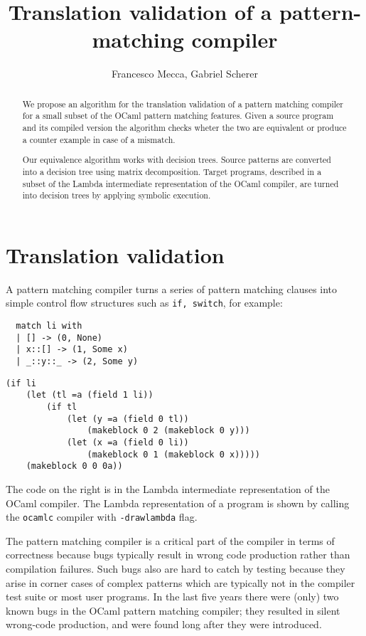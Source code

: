 \documentclass[12pt]{article}
\title{Translation validation of a pattern-matching compiler}
\author{Francesco Mecca, Gabriel Scherer}
\begin{document}
\maketitle

\begin{abstract}
We propose an algorithm for the translation validation of a pattern
matching compiler for a small subset of the OCaml pattern
matching features. Given a source program and its compiled version the
algorithm checks wheter the two are equivalent or produce a counter
example in case of a mismatch.

Our equivalence algorithm works with decision trees. Source patterns are
converted into a decision tree using matrix decomposition.
Target programs, described in a subset of the Lambda intermediate
representation of the OCaml compiler, are turned into decision trees
by applying symbolic execution.
\end{abstract}
\section{Translation validation}
A pattern matching compiler turns a series of pattern matching clauses
into simple control flow structures such as \texttt{if, switch}, for example:

\begin{minipage}{0.3\linewidth}
\begin{lstlisting}
  match li with
  | [] -> (0, None)
  | x::[] -> (1, Some x)
  | _::y::_ -> (2, Some y)
\end{lstlisting}
\end{minipage}
\hfill
\begin{minipage}{0.7\linewidth}
\begin{lstlisting}
(if li
    (let (tl =a (field 1 li))
        (if tl
            (let (y =a (field 0 tl))
                (makeblock 0 2 (makeblock 0 y)))
            (let (x =a (field 0 li))
                (makeblock 0 1 (makeblock 0 x)))))
    (makeblock 0 0 0a))
\end{lstlisting}
\end{minipage}

The code on the right is in the Lambda intermediate representation of
the OCaml compiler. The Lambda representation of a program is shown by
calling the \texttt{ocamlc} compiler with \texttt{-drawlambda} flag.

The pattern matching compiler is a critical part of the compiler
in terms of correctness because bugs typically result in wrong code
production rather than compilation failures.
Such bugs also are hard to catch by testing because they arise in
corner cases of complex patterns which are typically not in the
compiler test suite or most user programs.
In the last five years there were (only) two known bugs in the OCaml pattern
matching compiler; they resulted in silent wrong-code production,
and were found long after they were introduced.
\end{document}
